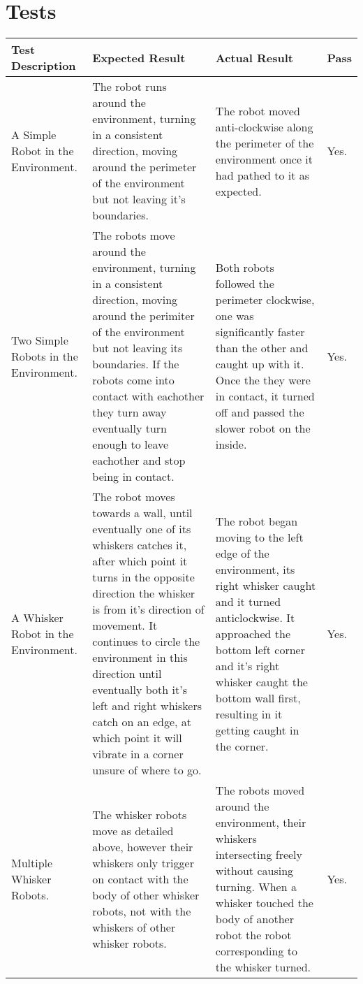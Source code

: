 \chapter{Tests}
\begingroup
\def\arraystretch{1.3}%
\begin{longtabu}{X[l]X[2,l]X[1.5,l]l}
    Test Description & Expected Result & Actual Result & Pass \\\hline\endhead
    A Simple Robot in the Environment.
        & The robot runs around the environment, turning in a consistent direction, moving around the perimeter of the environment but not leaving it's boundaries.
        & The robot moved anti-clockwise along the perimeter of the environment once it had pathed to it as expected.
        & Yes. \\
    Two Simple Robots in the Environment.
        & The robots move around the environment, turning in a consistent direction, moving around the perimiter of the environment but not leaving its boundaries. If the robots come into contact with eachother they turn away eventually turn enough to leave eachother and stop being in contact.
        & Both robots followed the perimeter clockwise, one was significantly faster than the other and caught up with it. Once the they were in contact, it turned off and passed the slower robot on the inside.
        & Yes. \\
    A Whisker Robot in the Environment.
        & The robot moves towards a wall, until eventually one of its whiskers catches it, after which point it turns in the opposite direction the whisker is from it's direction of movement. It continues to circle the environment in this direction until eventually both it's left and right whiskers catch on an edge, at which point it will vibrate in a corner unsure of where to go.
        & The robot began moving to the left edge of the environment, its right whisker caught and it turned anticlockwise. It approached the bottom left corner and it's right whisker caught the bottom wall first, resulting in it getting caught in the corner.
        & Yes. \\
    Multiple Whisker Robots.
        & The whisker robots move as detailed above, however their whiskers only trigger on contact with the body of other whisker robots, not with the whiskers of other whisker robots.
        & The robots moved around the environment, their whiskers intersecting freely without causing turning. When a whisker touched the body of another robot the robot corresponding to the whisker turned.
        & Yes. \\

\end{longtabu}
